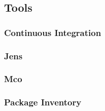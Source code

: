 \documentclass[aspectratio=169]{beamer}
\begin{document}
\subsection{Tools}
\begin{frame}
    \frametitle{Continuous Integration}
\end{frame}


\begin{frame}
    \frametitle{Jens}
\end{frame}


\begin{frame}
    \frametitle{Mco}
\end{frame}


\begin{frame}
    \frametitle{Package Inventory}
\end{frame}

\end{document}
